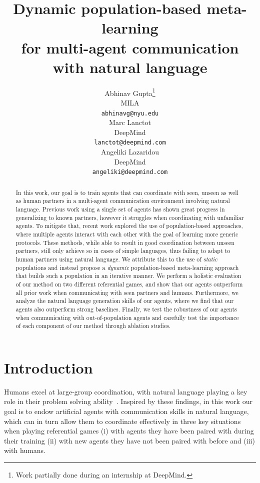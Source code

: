 \documentclass{article}
\title{Dynamic population-based meta-learning\\ for multi-agent communication\\ with natural language}
\author{
  Abhinav Gupta\thanks{Work partially done during an internship at DeepMind.} \\
  MILA \\
  \texttt{abhinavg@nyu.edu} \\
   \And
   Marc Lanctot \\
   DeepMind \\
   \texttt{lanctot@deepmind.com} \\
   \And
   Angeliki Lazaridou \\
   DeepMind \\
   \texttt{angeliki@deepmind.com} \\
}
\begin{document}
\maketitle

\begin{abstract}
In this work, our goal is to train agents that can coordinate with seen, unseen as well as human partners in a multi-agent communication environment involving natural language. Previous work using a single set of agents has shown great progress in generalizing to known partners, however it struggles when coordinating with unfamiliar agents. To mitigate that, recent work explored the use of population-based approaches, where multiple agents interact with each other with the goal of learning more generic protocols. These methods, while able to result in good coordination between unseen partners, still only achieve so in cases of simple languages, thus failing to adapt to human partners using natural language. We attribute this to the use of \emph{static} populations and instead propose a \emph{dynamic} population-based meta-learning approach that builds such a population in an iterative manner. We perform a holistic evaluation of our method on two different referential games, and show that our agents outperform all prior work when communicating with seen partners and humans. Furthermore, we analyze the natural language generation skills of our agents, where we find that our agents also outperform strong baselines. Finally, we test the robustness of our agents when communicating with out-of-population agents and carefully test the importance of each component of our method through ablation studies.
\end{abstract}

\section{Introduction}
Humans excel at large-group coordination, with natural language playing a key role in their problem solving ability~\citep{Tomasello:2010,barrett-royalsoc}. Inspired by these findings, in this work our goal is to endow artificial agents with communication skills in natural language, which can in turn allow them to coordinate effectively in three key situations when playing referential games (i) with agents they have been paired with during their training (ii) with new agents they have not been paired with before and (iii) with humans.
\end{document}
